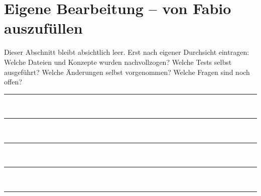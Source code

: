 \documentclass[11pt,a4paper]{article}
\begin{document}
\section*{Eigene Bearbeitung -- von Fabio auszufüllen}
Dieser Abschnitt bleibt absichtlich leer. Erst nach eigener Durchsicht eintragen: Welche Dateien und Konzepte wurden nachvollzogen? Welche Tests selbst ausgeführt? Welche Änderungen selbst vorgenommen? Welche Fragen sind noch offen?

\vspace{7mm}
\noindent\rule{\linewidth}{0.3pt}\\[12mm]
\rule{\linewidth}{0.3pt}\\[12mm]
\rule{\linewidth}{0.3pt}\\[12mm]
\rule{\linewidth}{0.3pt}\\[12mm]
\rule{\linewidth}{0.3pt}
\end{document}
